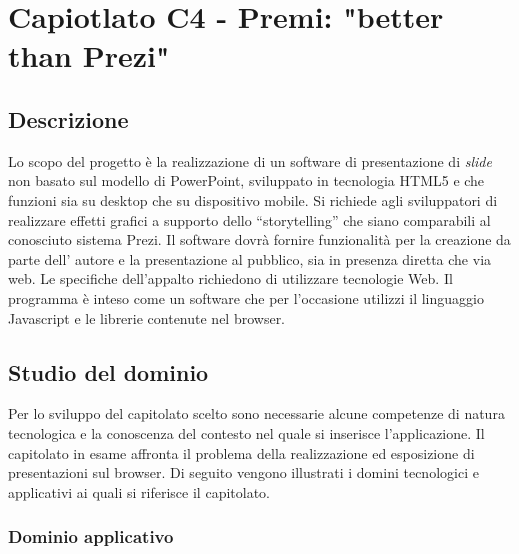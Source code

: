\section{Capiotlato C4 - Premi: "better than Prezi"}
\subsection{Descrizione}

Lo scopo del progetto è la realizzazione di un software di presentazione di \textit{slide} non basato sul modello di PowerPoint, sviluppato in tecnologia HTML5 e che funzioni sia su desktop che su dispositivo mobile. Si richiede agli sviluppatori di realizzare effetti grafici a supporto dello
“storytelling” che siano comparabili al conosciuto sistema Prezi. Il software dovrà fornire funzionalità per la creazione da parte dell' autore e la presentazione al pubblico, sia in presenza diretta che via web. Le specifiche dell'appalto richiedono di utilizzare tecnologie Web. Il programma è inteso come un software che per l'occasione utilizzi il linguaggio Javascript e le librerie contenute
nel browser.

\subsection{Studio del dominio}
Per lo sviluppo del capitolato scelto sono necessarie alcune competenze di natura tecnologica e la conoscenza del contesto nel quale si inserisce l’applicazione. Il capitolato in esame affronta il problema della realizzazione ed esposizione di presentazioni sul browser. Di seguito vengono illustrati i domini tecnologici e applicativi ai quali si riferisce il capitolato.

\subsubsection{Dominio applicativo}

